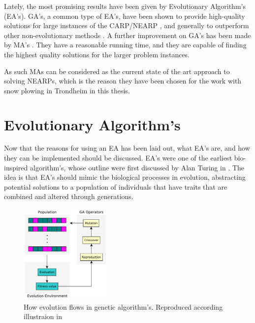 Lately, the most promising results have been given by Evolutionary Algorithm's (EA's). GA's, a common type of EA's, have been shown to provide high-quality solutions for large instances of the CARP/NEARP \citep{lacomme2001GA}, and generally to outperform other non-evolutionary methods \citep{wohlk2008decade}. A further improvement on GA's has been made by MA's \citep{prins2005memeticNEARP}. They have a reasonable running time, and they are capable of finding the highest quality solutions for the larger problem instances.

As such MAs can be considered as the current state of the art approach to solving NEARPs, which is the reason they have been chosen for the work with snow plowing in Trondheim in this thesis.



\section{Evolutionary Algorithm's} %
\label{sec:evolutionary_algorithms}
Now that the reasons for using an EA has been laid out, what EA's are, and how they can be implemented should be discussed. EA's were one of the earliest bio-inspired algorithm's, whose outline were first discussed by Alan Turing in \citet{turing1950computing}. The idea is that EA's should mimic the biological processes in evolution, abstracting potential solutions to a population of individuals that have traits that are combined and altered through generations.


\begin{figure}
    \begin{center}
        \includegraphics[width=0.4\textwidth]{figures/GA_general_flow_illustration.pdf}
    \end{center}
    \caption{How evolution flows in genetic algorithm's. Reproduced according illustraion in \citet{gaFlowIllustrationSource}}
    \label{fig:ga_flow_illustraion}
\end{figure}


